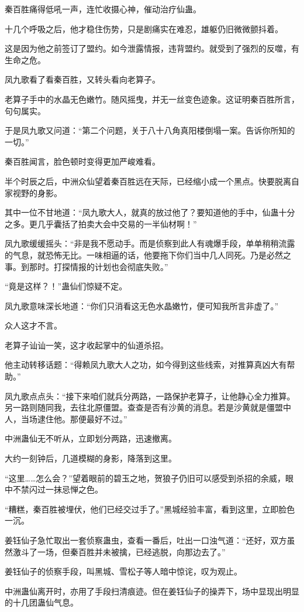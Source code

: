 \begin{this_body}
秦百胜痛得低吼一声，连忙收摄心神，催动治疗仙蛊。

十几个呼吸之后，他才稳住伤势，只是剧痛实在难忍，雄躯仍旧微微颤抖着。

这是因为他之前签订了盟约。如今泄露情报，违背盟约。就受到了强烈的反噬，有生命之危。

凤九歌看了看秦百胜，又转头看向老算子。

老算子手中的水晶无色嫩竹。随风摇曳，并无一丝变色迹象。这证明秦百胜所言，句句属实。

于是凤九歌又问道：“第二个问题，关于八十八角真阳楼倒塌一案。告诉你所知的一切。”

秦百胜闻言，脸色顿时变得更加严峻难看。

半个时辰之后，中洲众仙望着秦百胜远在天际，已经缩小成一个黑点。快要脱离自家视野的身影。

其中一位不甘地道：“凤九歌大人，就真的放过他了？要知道他的手中，仙蛊十分之多。更几乎囊括了拍卖大会中交易的一半仙材啊！”

凤九歌缓缓摇头：“非是我不愿动手。而是侦察到此人有魂爆手段，单单稍稍流露的气息，就恐怖无比。一味相逼的话，他要拖下你们当中几人同死。乃是必然之事。到那时。打探情报的计划也会彻底失败。”

“竟是这样？！”蛊仙们惊疑不定。

凤九歌意味深长地道：“你们只消看这无色水晶嫩竹，便可知我所言非虚了。”

众人这才不言。

老算子讪讪一笑，这才收起掌中的仙道杀招。

他主动转移话题：“得赖凤九歌大人之功，如今得到这些线索，对推算真凶大有帮助。”

凤九歌点点头：“接下来咱们就兵分两路，一路保护老算子，让他静心全力推算。另一路则随同我，去往北原僵盟。查查是否有沙黄的消息。若是沙黄就是僵盟中人，当场逮住他。那便最好不过。”

中洲蛊仙无不听从，立即划分两路，迅速撤离。

大约一刻钟后，几道模糊的身影，降落到这里。

“这里……怎么会？”望着眼前的碧玉之地，贺狼子仍旧可以感受到杀招的余威，眼中不禁闪过一抹忌惮之色。

“糟糕，秦百胜被埋伏，他们已经交过手了。”黑城经验丰富，看到这里，立即脸色一沉。

姜钰仙子急忙取出一套侦察蛊虫，查看一番后，吐出一口浊气道：“还好，双方虽然激斗了一场，但秦百胜并未被擒，已经逃脱，向那边去了。”

姜钰仙子的侦察手段，叫黑城、雪松子等人暗中惊诧，叹为观止。

中洲蛊仙离开时，亦用了手段扫清痕迹。但在姜钰仙子的操弄下，场中显现出明显的十几团蛊仙气息。


\end{this_body}

